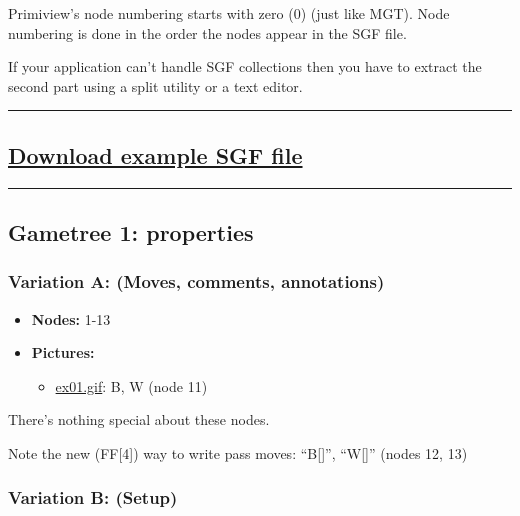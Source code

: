 Primiview's node numbering starts with zero (0) (just like MGT). Node
numbering is done in the order the nodes appear in the SGF file.

If your application can't handle SGF collections then you have to
extract the second part using a split utility or a text editor.

\begin{center}\rule{0.5\linewidth}{0.5pt}\end{center}

\subsection{\texorpdfstring{\href{https://red-bean.com/sgf/examples/ff4_ex.sgf}{Download
example SGF
file}}{Download example SGF file}}\label{download-example-sgf-file}

\begin{center}\rule{0.5\linewidth}{0.5pt}\end{center}

\subsection{Gametree 1: properties}\label{gametree-1-properties}

\subsubsection{Variation A: (Moves, comments,
annotations)}\label{variation-a-moves-comments-annotations}

\begin{itemize}
\item
  \textbf{Nodes:} 1-13
\item
  \textbf{Pictures:}

  \begin{itemize}
  \tightlist
  \item
    \href{https://red-bean.com/sgf/examples/ex01.gif}{ex01.gif}: B, W
    (node 11)
  \end{itemize}
\end{itemize}

There's nothing special about these nodes.

Note the new (FF{[}4{]}) way to write pass moves: ``B{[}{]}'',
``W{[}{]}'' (nodes 12, 13)

\subsubsection{Variation B: (Setup)}\label{variation-b-setup}

